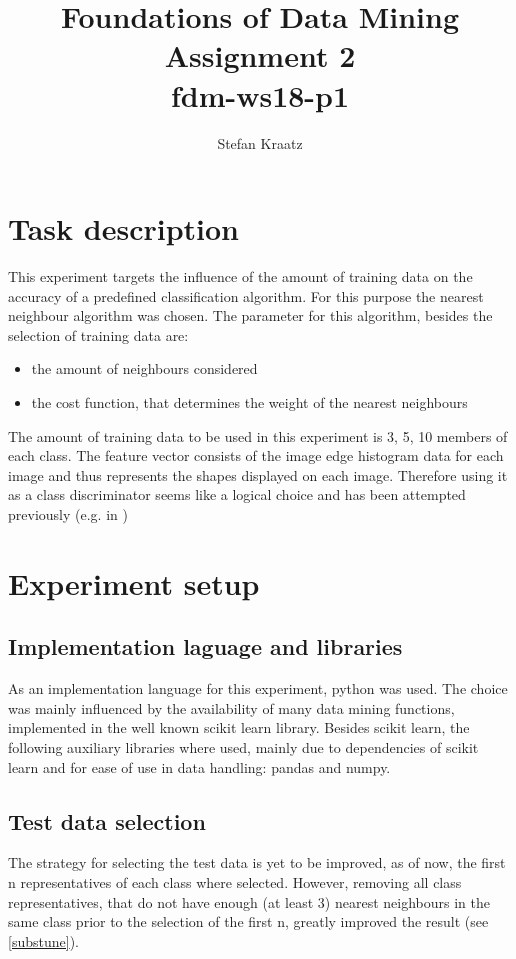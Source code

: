 \documentclass[10pt,a4paper]{proc}
\author{Stefan Kraatz}
\title{Foundations of Data Mining\\Assignment 2\\fdm-ws18-p1}
\begin{document}
\maketitle
\onecolumn
\section{Task description}
This experiment targets the influence of the amount of training data on the accuracy of a predefined classification algorithm. For this purpose the nearest neighbour algorithm was chosen. The parameter for this algorithm, besides the selection of training data are:
\begin{itemize}
\item the amount of neighbours considered
\item the cost function, that determines the weight of the nearest neighbours
\end{itemize}
The amount of training data to be used in this experiment is 3, 5, 10 members of each class. The feature vector consists of the image edge histogram data for each image and thus represents the shapes displayed on each image. Therefore using it as a class discriminator seems like a logical choice and has been attempted previously (e.g. in \cite{4610973})
\section{Experiment setup}
\subsection*{Implementation laguage and libraries}
As an implementation language for this experiment, python was used. The choice was mainly influenced by the availability of many data mining functions, implemented in the well known scikit learn library. Besides scikit learn, the following auxiliary libraries where used, mainly due to dependencies of scikit learn and for ease of use in data handling: pandas and numpy.
\subsection*{Test data selection}
The strategy for selecting the test data is yet to be improved, as of now, the first n representatives of each class where selected. However, removing all class representatives, that do not have enough (at least 3) nearest neighbours in the same class prior to the selection of the first n, greatly improved the result (see \ref{substune}).
\end{document}
